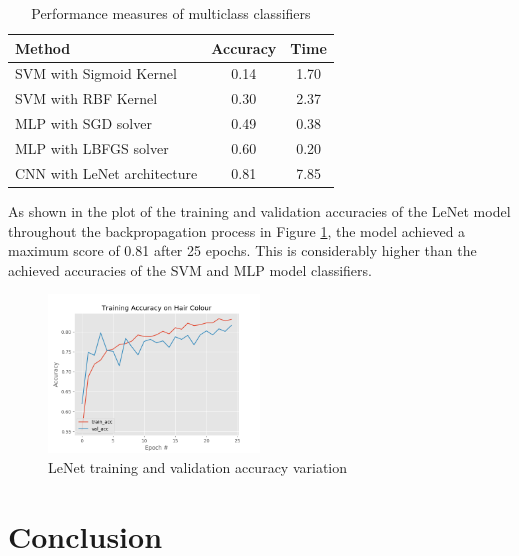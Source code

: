 \documentclass[conference]{IEEEtran}
\begin{document}
\begin{table}[htp]
\caption{Performance measures of multiclass classifiers}
\begin{center}
\renewcommand{\arraystretch}{1.5}
\begin{tabular}{|l|c|c|}
\hline
\hspace{1cm} Method & Accuracy & Time\\ \hline
SVM with Sigmoid Kernel & 0.14 & 1.70\\ \hline
SVM with RBF Kernel & 0.30 & 2.37\\ \hline
MLP with SGD solver & 0.49 & 0.38\\ \hline
MLP with LBFGS solver & 0.60 & 0.20\\ \hline
CNN with LeNet architecture & 0.81 & 7.85\\ \hline
\end{tabular}
\end{center}
\label{tab: mult}
\end{table}%

As shown in the plot of the training and validation accuracies of the LeNet model throughout the backpropagation process in Figure \ref{fig: CNN}, the model achieved a maximum score of 0.81 after 25 epochs. This is considerably higher than the achieved accuracies of the SVM and MLP model classifiers.

\begin{figure} [h] %
  \centering
    \includegraphics[width=0.5\textwidth]{graphs/T5_CNN_Keras} 
    \caption{LeNet training and validation accuracy variation}
    \label{fig: CNN}
\end{figure}

\break

\section{Conclusion} \label{s-concl}
\end{document}
